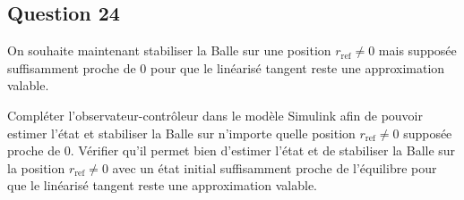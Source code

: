 \documentclass[class=article, crop=false]{standalone}
\begin{document}
\subsection{Question 24}
On souhaite maintenant stabiliser la Balle sur une position $r_{\text{ref}} \neq 0$ mais supposée suffisamment proche de 0 pour que le linéarisé tangent reste une approximation valable.
\begin{exercise}
    Compléter l'observateur-contrôleur dans le modèle Simulink afin de pouvoir estimer l'état et stabiliser la Balle sur n'importe quelle position $r_{\text{ref}} \neq 0$ supposée proche de 0. Vérifier qu'il permet bien d'estimer l'état et de stabiliser la Balle sur la position $r_{\text{ref}} \neq 0$ avec un état initial suffisamment proche de l'équilibre pour que le linéarisé tangent reste une approximation valable.
\end{exercise}
\end{document}
